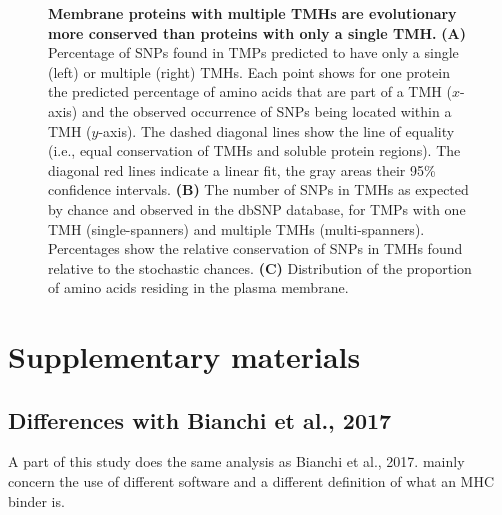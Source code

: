 \begin{figure}[!htbp]
  \caption{ \textbf{Membrane proteins with multiple TMHs are evolutionary more conserved than proteins with only a single TMH.}
      \textbf{(A)} 
      Percentage of SNPs found in TMPs predicted to have only a single
      (left) or multiple (right) TMHs.
      Each point shows for one protein the predicted percentage of amino acids that are part of a TMH ($x$-axis) and the observed occurrence of SNPs being located within a TMH ($y$-axis). The dashed diagonal lines show the line of equality (i.e., equal conservation of TMHs and soluble protein regions). 
      The diagonal red lines indicate a linear fit, the gray areas their 95\% confidence intervals.
      \textbf{(B)} 
      The number of SNPs in TMHs as expected by chance 
      and observed in the dbSNP database, 
      for TMPs with one TMH (single-spanners) and multiple TMHs (multi-spanners).
      Percentages show the relative conservation
      of SNPs in TMHs found relative to the stochastic chances.
      \textbf{(C)} 
      Distribution of the proportion of amino acids residing
      in the plasma membrane. 
     }
\end{figure}

\clearpage

\newpage
\appendix
\section{Supplementary materials}

\renewcommand{\thefigure}{S\arabic{figure}}
\setcounter{figure}{0}

\renewcommand{\thetable}{S\arabic{table}}
\setcounter{table}{0}



\subsection{Differences with Bianchi et al., 2017}

A part of this study does the same analysis as Bianchi et al., 2017.
mainly concern the use of different
software and a different definition of what an MHC binder is.

